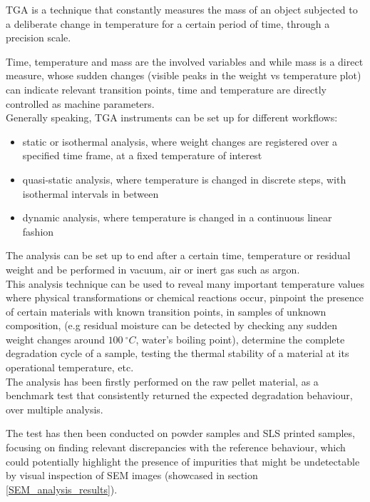 \documentclass{article}
\begin{document}
        TGA is a technique that constantly measures the mass of an object subjected to a deliberate 
        change in temperature for a certain period of time, through a precision scale. 

        Time, temperature and mass are the involved variables and while mass is a direct measure, whose sudden changes (visible peaks
        in the weight vs temperature plot) can indicate relevant transition points, time and temperature are directly controlled 
        as machine parameters. \\ 

        Generally speaking, TGA instruments can be set up for different workflows: 

                \begin{itemize}
                    \item static or isothermal analysis, where weight changes are registered over a specified time frame, 
                    at a fixed temperature of interest
                    \item quasi-static analysis, where temperature is changed in discrete steps, with isothermal intervals in between 
                    \item dynamic analysis, where temperature is changed in a continuous linear fashion
                \end{itemize}

            The analysis can be set up to end after a certain time, temperature or residual weight and be performed 
            in vacuum, air or inert gas such as argon. \\

        This analysis technique can be used to reveal many important temperature values where physical transformations or chemical 
        reactions occur, pinpoint the presence of certain materials with known transition points, in samples of unknown composition, 
        (e.g residual moisture can be detected by checking any sudden weight changes around $100 \ ^{\circ}C $, water's boiling point), 
        determine the complete degradation cycle of a sample, testing the thermal stability of a material at its operational temperature, etc. \\ 

        The analysis has been firstly performed on the raw pellet material, as a benchmark test
        that consistently returned the expected degradation behaviour, over multiple analysis. 

            The test has then been conducted on powder samples and SLS printed samples, focusing on finding relevant 
            discrepancies with the reference behaviour, which could potentially highlight the presence of impurities
            that might be undetectable by visual inspection of SEM images (showcased in section \ref{SEM_analysis_results}). \\ 
\end{document}
